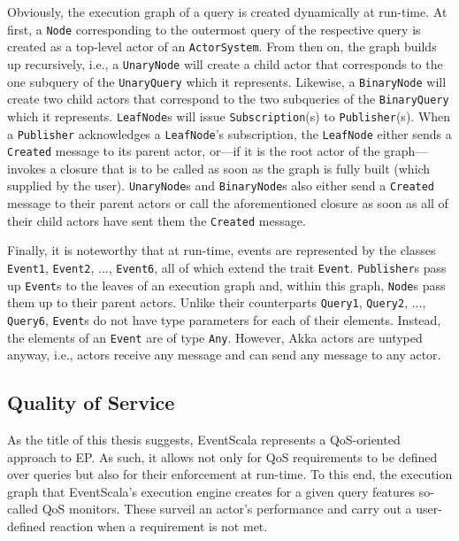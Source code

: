 \documentclass[article, 10pt, type=bsc, colorback, accentcolor=tud8b, parskip=half, bibliography=totocnumbered]{tudthesis}
\begin{document}
Obviously, the execution graph of a query is created dynamically at run-time.
At first, a \lstinline{Node} corresponding to the outermost query of the respective query is created as a top-level actor of an \lstinline{ActorSystem}.
From then on, the graph builds up recursively, i.e., a \lstinline{UnaryNode} will create a child actor that corresponds to the one subquery of the \lstinline{UnaryQuery} which it represents.
Likewise, a \lstinline{BinaryNode} will create two child actors that correspond to the two subqueries of the \lstinline{BinaryQuery} which it represents.
\lstinline{LeafNode}s will issue \lstinline{Subscription}(s) to \lstinline{Publisher}(s).
When a \lstinline{Publisher} acknowledges a \lstinline{LeafNode}'s subscription, the \lstinline{LeafNode} either sends a \lstinline{Created} message to its parent actor, or---if it is the root actor of the graph---invokes a closure that is to be called as soon as the graph is fully built (which supplied by the user). \lstinline{UnaryNode}s and \lstinline{BinaryNode}s also either send a \lstinline{Created} message to their parent actors or call the aforementioned closure as soon as all of their child actors have sent them the \lstinline{Created} message.

Finally, it is noteworthy that at run-time, events are represented by the classes \lstinline{Event1}, \lstinline{Event2}, ..., \lstinline{Event6}, all of which extend the trait \lstinline{Event}.
\lstinline{Publisher}s pass up \lstinline{Event}s to the leaves of an execution graph and, within this graph, \lstinline{Node}s pass them up to their parent actors.
Unlike their counterparts \lstinline{Query1}, \lstinline{Query2}, ..., \lstinline{Query6}, \lstinline{Event}s do not have type parameters for each of their elements.
Instead, the elements of an \lstinline{Event} are of type \lstinline{Any}.
However, Akka actors are untyped anyway, i.e., actors receive any message and can send any message to any actor.

\subsection{Quality of Service}
\label{sec:qos}

As the title of this thesis suggests, EventScala represents a QoS-oriented approach to EP.
As such, it allows not only for QoS requirements to be defined over queries but also for their enforcement at run-time.
To this end, the execution graph that EventScala's execution engine creates for a given query features so-called QoS monitors.
These surveil an actor's performance and carry out a user-defined reaction when a requirement is not met.
\end{document}

